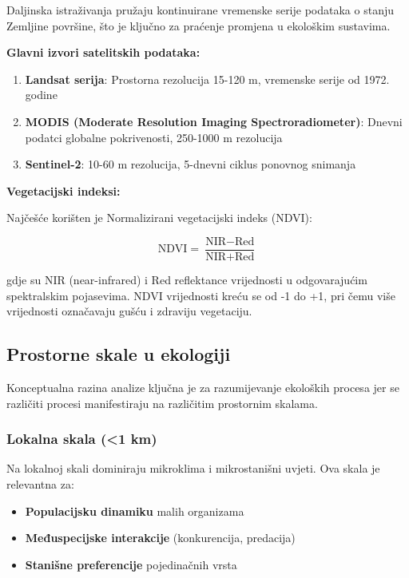 \documentclass[11pt,oneside]{book}
\begin{document}
Daljinska istraživanja pružaju kontinuirane vremenske serije podataka o stanju Zemljine površine, što je ključno za praćenje promjena u ekološkim sustavima.

\textbf{Glavni izvori satelitskih podataka:}

\begin{enumerate}
	\item \textbf{Landsat serija}: Prostorna rezolucija 15-120 m, vremenske serije od 1972. godine
	\item \textbf{MODIS (Moderate Resolution Imaging Spectroradiometer)}: Dnevni podatci globalne pokrivenosti, 250-1000 m rezolucija
	\item \textbf{Sentinel-2}: 10-60 m rezolucija, 5-dnevni ciklus ponovnog snimanja
\end{enumerate}

\textbf{Vegetacijski indeksi:}

Najčešće korišten je Normalizirani vegetacijski indeks (NDVI):

\begin{equation}
	\text{NDVI} = \frac{\text{NIR} - \text{Red}}{\text{NIR} + \text{Red}}
\end{equation}

gdje su NIR (near-infrared) i Red reflektance vrijednosti u odgovarajućim spektralskim pojasevima. NDVI vrijednosti kreću se od -1 do +1, pri čemu više vrijednosti označavaju gušću i zdraviju vegetaciju.

\subsection{Prostorne skale u ekologiji}

Konceptualna razina analize ključna je za razumijevanje ekoloških procesa jer se različiti procesi manifestiraju na različitim prostornim skalama.

\subsubsection{Lokalna skala (<1 km)}

Na lokalnoj skali dominiraju mikroklima i mikrostanišni uvjeti. Ova skala je relevantna za:

\begin{itemize}
	\item \textbf{Populacijsku dinamiku} malih organizama
	\item \textbf{Međuspecijske interakcije} (konkurencija, predacija)
	\item \textbf{Stanišne preferencije} pojedinačnih vrsta
\end{itemize}
\end{document}
